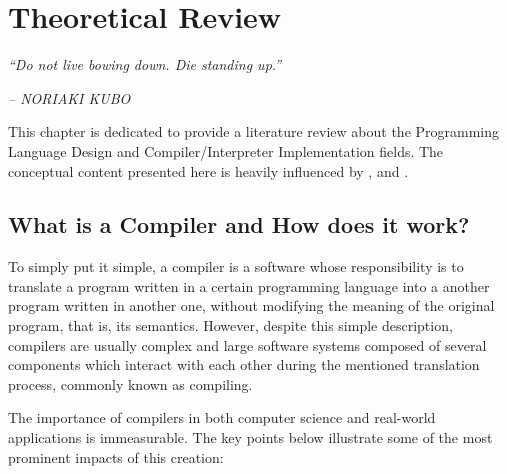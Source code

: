\chapter{Theoretical Review} \label{Cap:theoretical_review}

\begin{displayquote}
    \begin{center}
        \textit{``Do not live bowing down. Die standing up.''}
    \end{center}
\end{displayquote}

\begin{flushright}
   \textit{-- NORIAKI KUBO}
\end{flushright}

This chapter is dedicated to provide a literature review about the Programming Language Design and Compiler/Interpreter Implementation fields. The conceptual content presented here is heavily influenced by \cite{aho1986compilers}, \cite{cooper2022engineering} and \cite{nystrom2021crafting}.

\section{What is a Compiler and How does it work?}
To simply put it simple, a compiler is a software whose responsibility is to translate a program written in a certain programming language into a another program written in another one, without modifying the meaning of the original program, that is, its semantics. However, despite this simple description, compilers are usually complex and large software systems composed of several components which interact with each other during the mentioned translation process, commonly known as compiling.

The importance of compilers in both computer science and real-world applications is immeasurable. The key points below illustrate some of the most prominent impacts of this creation:

